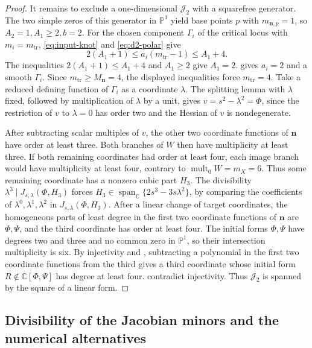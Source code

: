\documentclass[11pt,letterpaper]{article}
\numberwithin{equation}{section}
\theoremstyle{remark}
\theoremstyle{plain}
\newcommand{\C}{\mathbb{C}}
\newcommand{\mult}{\operatorname{mult}}
\begin{document}
\begin{proof}
It remains to exclude a one-dimensional $\mathcal J_2$ with a
squarefree generator.  The two simple zeros of this generator in $\mathbb P^1$ yield base
points $p$ with $m_{\boldsymbol n,p}=1$, so $A_2=1,A_1\geq2,b=2$.  For the chosen component $\Gamma_i$ of the critical locus
with $m_i=m_{\mathrm{tr}}$,
\eqref{eq:input-knot} and \eqref{eq:d2-polar} give
\[
 2(A_1+1)\leq a_i(m_{\mathrm{tr}}-1)\leq A_1+4.
\]
The inequalities $2(A_1+1)\leq A_1+4$ and $A_1\geq2$ give
$A_1=2$.   gives $a_i=2$ and a smooth
$\Gamma_i$.  Since $m_{\mathrm{tr}}\geq M_{\boldsymbol n}=4$,
the displayed inequalities force $m_{\mathrm{tr}}=4$.
Take a reduced defining function of $\Gamma_i$ as a coordinate $\lambda$.  The splitting lemma
with $\lambda$ fixed, followed by multiplication of $\lambda$ by a unit,
gives $v=s^2-\lambda^2=\Phi$, since the restriction of $v$ to $\lambda=0$
has order two and the Hessian of $v$ is nondegenerate.

After subtracting scalar multiples of $v$, the other two coordinate functions of $\boldsymbol n$ have order
at least three.  Both branches of $W$ then have multiplicity at
least three.  If both remaining coordinates had order at least
four, each image branch would have multiplicity at least four,
contrary to $\mult_0W=m_X=6$.
Thus some remaining coordinate has a nonzero cubic part $H_3$.  The divisibility
$\lambda^3\mid J_{s,\lambda}(\Phi,H_3)$ forces
$H_3\in\operatorname{span}_{\C}\{2s^3-3s\lambda^2\}$, by comparing the coefficients of $\lambda^0,\lambda^1,\lambda^2$
in $J_{s,\lambda}(\Phi,H_3)$.
After a linear change of target coordinates, the homogeneous parts of
least degree in the first two coordinate functions of $\boldsymbol n$
are $\Phi,\Psi$, and the third coordinate has order at least four.
The initial forms $\Phi,\Psi$ have degrees two and three and no
common zero in $\mathbb P^1$, so their intersection multiplicity is six.
By injectivity and , subtracting a polynomial
in the first two coordinate functions from the third gives a third
coordinate whose initial form
$R\notin\C[\Phi,\Psi]$ has degree at least four.
 contradict injectivity.
Thus $\mathcal J_2$ is spanned by the square of a linear form.
\end{proof}

\subsection{Divisibility of the Jacobian minors and the numerical alternatives}
\end{document}
